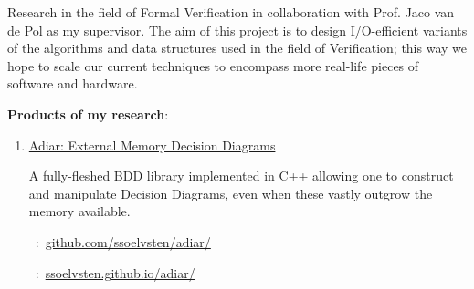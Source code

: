 
Research in the field of Formal Verification in collaboration with Prof. Jaco
van de Pol as my supervisor. The aim of this project is to design I/O-efficient
variants of the algorithms and data structures used in the field of
Verification; this way we hope to scale our current techniques to encompass more
real-life pieces of software and hardware.

\medskip

\textbf{Products of my research}:

\medskip

\hspace{1em}
\begin{minipage}{29.5em}
  \begin{flushleft}
    \begin{enumerate}

    \item[\faCode]
      \href{http://github.com/ssoelvsten/adiar}{Adiar: External Memory Decision Diagrams}

      \smallskip

      A fully-fleshed BDD library implemented in C++ allowing one to construct
      and manipulate Decision Diagrams, even when these vastly outgrow the
      memory available.

      \smallskip

      \faGit\ :\
      \href{https://github.com/ssoelvsten/adiar/}{github.com/ssoelvsten/adiar/}

      \faFileTextO\ :\
      \href{https://ssoelvsten.github.io/adiar/}{ssoelvsten.github.io/adiar/}

    \end{enumerate}
  \end{flushleft}
\end{minipage}

\medskip
